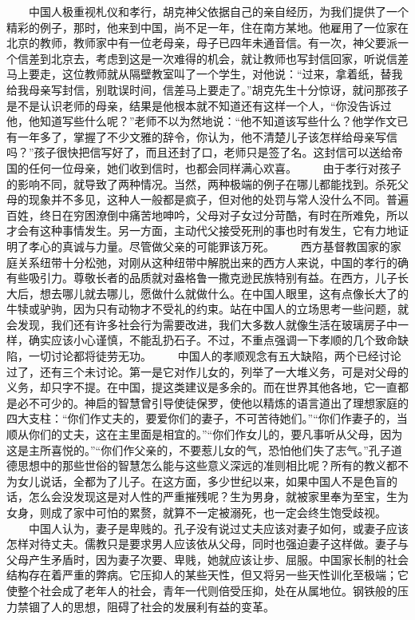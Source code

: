 \documentclass[12pt,oneside]{book}
\begin{document}
\begin{common-format}
　　中国人极重视札仪和孝行，胡克神父依据自己的亲自经历，为我们提供了一个精彩的例子，那时，他来到中国，尚不足一年，住在南方某地。他雇用了一位家在北京的教师，教师家中有一位老母亲，母子已四年未通音信。有一次，神父要派一个信差到北京去，考虑到这是一次难得的机会，就让教师也写封信回家，听说信差马上要走，这位教师就从隔壁教室叫了一个学生，对他说：“过来，拿着纸，替我给我母亲写封信，别耽误时间，信差马上要走了。”胡克先生十分惊讶，就问那孩子是不是认识老师的母亲，结果是他根本就不知道还有这样一个人，“你没告诉过他，他知道写些什么呢？”老师不以为然地说：“他不知道该写些什么？他学作文已有一年多了，掌握了不少文雅的辞令，你认为，他不清楚儿子该怎样给母亲写信吗？”孩子很快把信写好了，而且还封了口，老师只是签了名。这封信可以送给帝国的任何一位母亲，她们收到信时，也都会同样满心欢喜。 
　　由于孝行对孩子的影响不同，就导致了两种情况。当然，两种极端的例子在哪儿都能找到。杀死父母的现象并不多见，这种人一般都是疯子，但对他的处罚与常人没什么不同。普遍百姓，终日在穷困潦倒中痛苦地呻吟，父母对子女过分苛酷，有时在所难免，所以才会有这种事情发生。另一方面，主动代父接受死刑的事也时有发生，它有力地证明了孝心的真诚与力量。尽管做父亲的可能罪该万死。 
　　西方基督教国家的家庭关系纽带十分松弛，对刚从这种纽带中解脱出来的西方人来说，中国的孝行的确有些吸引力。尊敬长者的品质就对盎格鲁一撒克逊民族特别有益。在西方，儿子长大后，想去哪儿就去哪儿，愿做什么就做什么。在中国人眼里，这有点像长大了的牛犊或驴驹，因为只有动物才不受礼的约束。站在中国人的立场思考一些问题，就会发现，我们还有许多社会行为需要改进，我们大多数人就像生活在玻璃房子中一样，确实应该小心谨慎，不能乱扔石子。不过，不重点强调一下孝顺的几个致命缺陷，一切讨论都将徒劳无功。 
　　中国人的孝顺观念有五大缺陷，两个已经讨论过了，还有三个未讨论。第一是它对作儿女的，列举了一大堆义务，可是对父母的义务，却只字不提。在中国，提这类建议是多余的。而在世界其他各地，它一直都是必不可少的。神启的智慧曾引导使徒保罗，使他以精炼的语言道出了理想家庭的四大支柱：“你们作丈夫的，要爱你们的妻子，不可苦待她们。”“你们作妻子的，当顺从你们的丈夫，这在主里面是相宜的。”“你们作女儿的，要凡事听从父母，因为这是主所喜悦的。”“你们作父亲的，不要惹儿女的气，恐怕他们失了志气。”孔子道德思想中的那些世俗的智慧怎么能与这些意义深远的准则相比呢？所有的教义都不为女儿说话，全都为了儿子。在这方面，多少世纪以来，如果中国人不是色盲的话，怎么会没发现这是对人性的严重摧残呢？生为男身，就被家里奉为至宝，生为女身，则成了家中可怕的累赘，就算不一定被溺死，也一定会终生饱受歧视。 
　　中国人认为，妻子是卑贱的。孔子没有说过丈夫应该对妻子如何，或妻子应该怎样对待丈夫。儒教只是要求男人应该依从父母，同时也强迫妻子这样做。妻子与父母产生矛盾时，因为妻子次要、卑贱，她就应该让步、屈服。中国家长制的社会结构存在着严重的弊病。它压抑人的某些天性，但又将另一些天性训化至极端；它使整个社会成了老年人的社会，青年一代则倍受压抑，处在从属地位。钢铁般的压力禁锢了人的思想，阻碍了社会的发展利有益的变革。 

\end{common-format}
\end{document}
